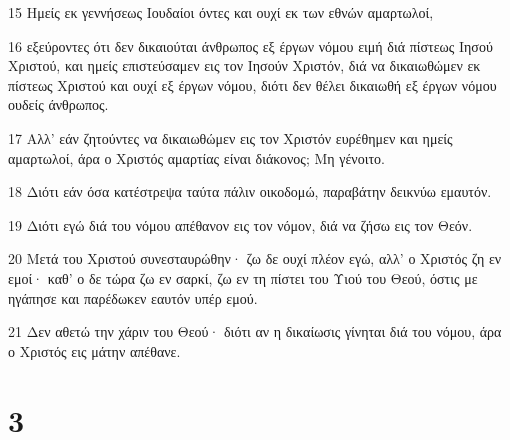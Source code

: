 \par 15 Ημείς εκ γεννήσεως Ιουδαίοι όντες και ουχί εκ των εθνών αμαρτωλοί,
\par 16 εξεύροντες ότι δεν δικαιούται άνθρωπος εξ έργων νόμου ειμή διά πίστεως Ιησού Χριστού, και ημείς επιστεύσαμεν εις τον Ιησούν Χριστόν, διά να δικαιωθώμεν εκ πίστεως Χριστού και ουχί εξ έργων νόμου, διότι δεν θέλει δικαιωθή εξ έργων νόμου ουδείς άνθρωπος.
\par 17 Αλλ' εάν ζητούντες να δικαιωθώμεν εις τον Χριστόν ευρέθημεν και ημείς αμαρτωλοί, άρα ο Χριστός αμαρτίας είναι διάκονος; Μη γένοιτο.
\par 18 Διότι εάν όσα κατέστρεψα ταύτα πάλιν οικοδομώ, παραβάτην δεικνύω εμαυτόν.
\par 19 Διότι εγώ διά του νόμου απέθανον εις τον νόμον, διά να ζήσω εις τον Θεόν.
\par 20 Μετά του Χριστού συνεσταυρώθην· ζω δε ουχί πλέον εγώ, αλλ' ο Χριστός ζη εν εμοί· καθ' ο δε τώρα ζω εν σαρκί, ζω εν τη πίστει του Υιού του Θεού, όστις με ηγάπησε και παρέδωκεν εαυτόν υπέρ εμού.
\par 21 Δεν αθετώ την χάριν του Θεού· διότι αν η δικαίωσις γίνηται διά του νόμου, άρα ο Χριστός εις μάτην απέθανε.

\chapter{3}

